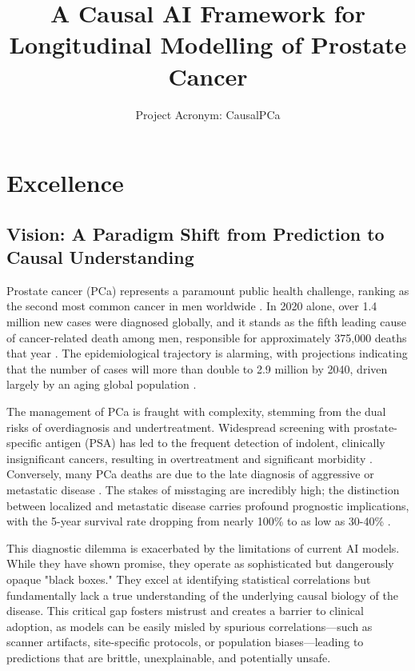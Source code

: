 \documentclass[11pt, a4paper]{article}
\title{A Causal AI Framework for Longitudinal Modelling of Prostate Cancer}
\author{Project Acronym: CausalPCa}
\date{}
\begin{document}
\maketitle

\section{Excellence}

\subsection{Vision: A Paradigm Shift from Prediction to Causal Understanding}
Prostate cancer (PCa) represents a paramount public health challenge, ranking as the second most common cancer in men worldwide \cite{CaraccioloCastello2024,DulleaOSullivan2025}. In 2020 alone, over 1.4 million new cases were diagnosed globally, and it stands as the fifth leading cause of cancer-related death among men, responsible for approximately 375,000 deaths that year \cite{CereserEvangelista2023,GammelSolari2024,DharCendejasGomez2024}. The epidemiological trajectory is alarming, with projections indicating that the number of cases will more than double to 2.9 million by 2040, driven largely by an aging global population \cite{UdovicichJia2025,SungFerlay2021}.

The management of PCa is fraught with complexity, stemming from the dual risks of overdiagnosis and undertreatment. Widespread screening with prostate-specific antigen (PSA) has led to the frequent detection of indolent, clinically insignificant cancers, resulting in overtreatment and significant morbidity \cite{PadhaniSchoots2023,JenaTaneja2018,CaraccioloCastello2022}. Conversely, many PCa deaths are due to the late diagnosis of aggressive or metastatic disease \cite{PadhaniSchoots2023}. The stakes of misstaging are incredibly high; the distinction between localized and metastatic disease carries profound prognostic implications, with the 5-year survival rate dropping from nearly 100\% to as low as 30-40\% \cite{WangODwyer2024,CereserEvangelista2023}.

This diagnostic dilemma is exacerbated by the limitations of current AI models. While they have shown promise, they operate as sophisticated but dangerously opaque "black boxes." They excel at identifying statistical correlations but fundamentally lack a true understanding of the underlying causal biology of the disease. This critical gap fosters mistrust and creates a barrier to clinical adoption, as models can be easily misled by spurious correlations—such as scanner artifacts, site-specific protocols, or population biases—leading to predictions that are brittle, unexplainable, and potentially unsafe.
\end{document}
